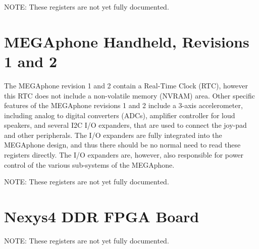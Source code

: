 NOTE: These registers are not yet fully documented.


\section{MEGAphone Handheld, Revisions 1 and 2}

The MEGAphone revision 1 and 2 contain a Real-Time Clock (RTC), however this RTC does not include a non-volatile memory (NVRAM)
area.  Other specific features of the MEGAphone revisions 1 and 2 include a 3-axis accelerometer, including analog to digital
converters (ADCs), amplifier controller for loud speakers, and several I2C I/O expanders, that are used to connect the joy-pad and other peripherals. The I/O expanders are
fully integrated into the MEGAphone design, and thus there should be no normal need to read these registers directly.  The I/O
expanders are, however, also responsible for power control of the various sub-systems of the MEGAphone.

NOTE: These registers are not yet fully documented.


\section{Nexys4 DDR FPGA Board}

NOTE: These registers are not yet fully documented.


